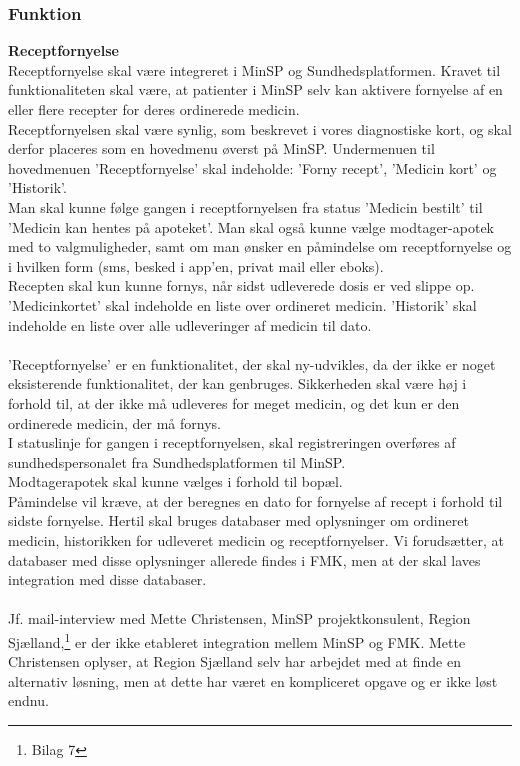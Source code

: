 \subsubsection{Funktion}
\textbf{Receptfornyelse}\\
Receptfornyelse skal være integreret i MinSP og Sundhedsplatformen. 
Kravet til funktionaliteten skal være, at patienter i MinSP selv kan aktivere fornyelse af en eller flere recepter for deres ordinerede medicin. 
\\
Receptfornyelsen skal være synlig, som beskrevet i vores diagnostiske kort, og skal derfor placeres som en hovedmenu øverst på MinSP. Undermenuen til hovedmenuen 'Receptfornyelse' skal indeholde: 'Forny recept', 'Medicin kort' og 'Historik'.
\\
Man skal kunne følge gangen i receptfornyelsen fra status 'Medicin bestilt' til 'Medicin kan hentes på apoteket'. Man skal også kunne vælge modtager-apotek med to valgmuligheder, samt om man ønsker en påmindelse om receptfornyelse og i hvilken form (sms, besked i app'en, privat mail eller eboks). 
\\ 
Recepten skal kun kunne fornys, når sidst udleverede dosis er ved slippe op.  
\\
'Medicinkortet' skal indeholde en liste over ordineret medicin.
'Historik' skal indeholde en liste over alle udleveringer af medicin til dato.
\\\\
'Receptfornyelse' er en funktionalitet, der skal ny-udvikles, da der ikke er noget eksisterende funktionalitet, der kan genbruges. Sikkerheden skal være høj i forhold til, at der ikke må udleveres for meget medicin, og det kun er den ordinerede medicin, der må fornys. \\
I statuslinje for gangen i receptfornyelsen, skal registreringen overføres af sundhedspersonalet fra Sundhedsplatformen til MinSP.\\
Modtagerapotek skal kunne vælges i forhold til bopæl.\\
Påmindelse vil kræve, at der beregnes en dato for fornyelse af recept i forhold til sidste fornyelse. Hertil skal bruges databaser med oplysninger om ordineret medicin, historikken for udleveret medicin og receptfornyelser. Vi forudsætter, at databaser med disse oplysninger allerede findes i FMK, men at der skal laves integration med disse databaser. \\
\\
Jf. mail-interview med Mette Christensen, MinSP projektkonsulent, Region Sjælland,\footnote{Bilag 7} er der ikke etableret integration mellem MinSP og FMK. Mette Christensen oplyser, at Region Sjælland selv har arbejdet med at finde en alternativ løsning, men at dette har været en kompliceret opgave og er ikke løst endnu. \\
